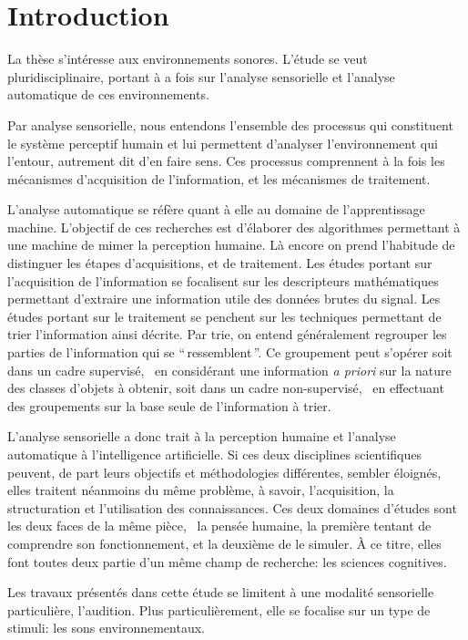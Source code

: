 \chapter{Introduction}\label{ch:pream_intro}

La thèse s'intéresse aux environnements sonores. L'étude se veut pluridisciplinaire, portant à a fois sur l'analyse sensorielle et l'analyse automatique de ces environnements. 

Par analyse sensorielle, nous entendons l'ensemble des processus qui constituent le système perceptif humain et lui permettent d'analyser l'environnement qui l'entour, autrement dit d'en faire sens. Ces processus comprennent à la fois les mécanismes d'acquisition de l'information, et les mécanismes de traitement. 

L'analyse automatique se réfère quant à elle au domaine de l'apprentissage machine. L'objectif de ces recherches est d'élaborer des algorithmes permettant à une machine de mimer la perception humaine. Là encore on prend l'habitude de distinguer les étapes d'acquisitions, et de traitement. Les études portant sur l'acquisition de l'information se focalisent sur les descripteurs mathématiques permettant d'extraire une information utile des données brutes du signal. Les études portant sur le traitement se penchent sur les techniques permettant de trier l'information ainsi décrite. Par trie, on entend généralement regrouper les parties de l'information qui se ``\,ressemblent\,''. Ce groupement peut s'opérer soit dans un cadre supervisé, \ie~en considérant une information \emph{a priori} sur la nature des classes d'objets à obtenir, soit dans un cadre non-supervisé, \ie~en effectuant des groupements sur la base seule de l'information à trier.   

L'analyse sensorielle a donc trait à la perception humaine et l'analyse automatique à l'intelligence artificielle. Si ces deux disciplines scientifiques peuvent, de part leurs objectifs et méthodologies différentes, sembler éloignés, elles traitent néanmoins du même problème, à savoir, l'acquisition, la structuration et l'utilisation des connaissances. Ces deux domaines d'études sont les deux faces de la même pièce, \ie~la pensée humaine, la première tentant de comprendre son fonctionnement, et la deuxième de le simuler. À ce titre, elles font toutes deux partie d'un même champ de recherche: les sciences cognitives. 

Les travaux présentés dans cette étude se limitent à une modalité sensorielle particulière, l'audition. Plus particulièrement, elle se focalise sur un type de stimuli: les sons environnementaux. 


